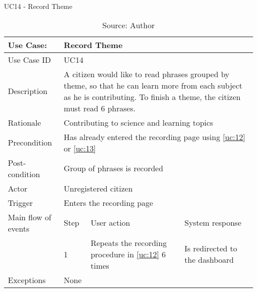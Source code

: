 \begin{table}[h]
\centering
\caption{UC14 - Record Theme}
\label{uc:14}
\begin{tabular}{|p{3cm}|p{1cm}|p{5cm}|p{5cm}|}
\hline
Use Case:       & \multicolumn{3}{p{11cm}|}{Record Theme} \\ \hline
Use Case ID     & \multicolumn{3}{p{11cm}|}{UC14} \\ \hline
Description     & \multicolumn{3}{p{11cm}|}{A citizen would like to read phrases grouped by theme, so that he can learn more from each subject as he is contributing. To finish a theme, the citizen must read 6 phrases.} \\ \hline
Rationale       & \multicolumn{3}{p{11cm}|}{Contributing to science and learning topics} \\ \hline
Precondition    & \multicolumn{3}{p{11cm}|}{Has already entered the recording page using \ref{uc:12} or \ref{uc:13}} \\ \hline
Post-condition  & \multicolumn{3}{p{11cm}|}{Group of phrases is recorded} \\ \hline
Actor           & \multicolumn{3}{p{11cm}|}{Unregistered citizen} \\ \hline
Trigger         & \multicolumn{3}{p{11cm}|}{Enters the recording page} \\ \hline
Main flow of events & Step  & User action & System response \\ \hline
                    & 1     & Repeats the recording procedure in \ref{uc:12} 6 times & Is redirected to the dashboard \\ \hline
Exceptions      & \multicolumn{3}{p{11cm}|}{None} \\ \hline
\end{tabular}
\caption*{Source: Author}
\end{table}

